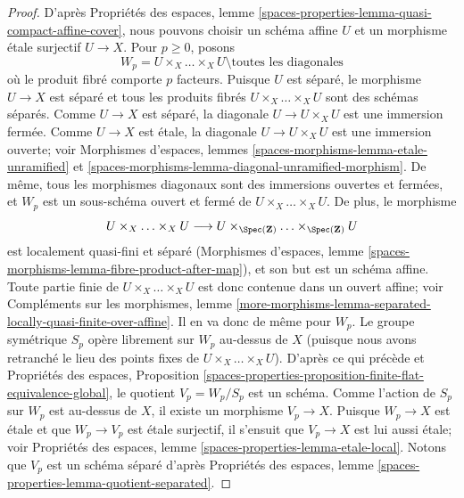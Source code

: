 \begin{proof}
D'après Propriétés des espaces, lemme
\ref{spaces-properties-lemma-quasi-compact-affine-cover},
nous pouvons choisir un schéma affine $U$ et un morphisme étale surjectif
$U \to X$. Pour $p \geq 0$, posons
$$
W_p = U \times_X \ldots \times_X U \setminus
\text{toutes les diagonales}
$$
où le produit fibré comporte $p$ facteurs. Puisque $U$ est séparé,
le morphisme $U \to X$ est séparé et tous les produits fibrés
$U \times_X \ldots \times_X U$ sont des schémas séparés. Comme $U \to X$
est séparé, la diagonale $U \to U \times_X U$ est une immersion fermée.
Comme $U \to X$ est étale, la diagonale $U \to U \times_X U$ est une
immersion ouverte; voir Morphismes d'espaces, lemmes
\ref{spaces-morphisms-lemma-etale-unramified} et
\ref{spaces-morphisms-lemma-diagonal-unramified-morphism}.
De même, tous les morphismes diagonaux sont des immersions ouvertes et
fermées, et $W_p$ est un sous-schéma ouvert et fermé de
$U \times_X \ldots \times_X U$. De plus, le morphisme
$$
U \times_X \ldots \times_X U \longrightarrow
U \times_{\Spec(\mathbf{Z})} \ldots \times_{\Spec(\mathbf{Z})} U
$$
est localement quasi-fini et séparé (Morphismes d'espaces,
lemme \ref{spaces-morphisms-lemma-fibre-product-after-map}),
et son but est un schéma affine. Toute partie finie de
$U \times_X \ldots \times_X U$ est donc contenue dans un ouvert affine;
voir Compléments sur les morphismes, lemme
\ref{more-morphisms-lemma-separated-locally-quasi-finite-over-affine}.
Il en va donc de même pour $W_p$.
Le groupe symétrique $S_p$ opère librement sur $W_p$ au-dessus de $X$
(puisque nous avons retranché le lieu des points fixes de
$U \times_X \ldots \times_X U$). D'après ce qui précède et
Propriétés des espaces, Proposition
\ref{spaces-properties-proposition-finite-flat-equivalence-global},
le quotient $V_p = W_p/S_p$ est un schéma. Comme l'action de $S_p$ sur
$W_p$ est au-dessus de $X$, il existe un morphisme $V_p \to X$.
Puisque $W_p \to X$ est étale et que $W_p \to V_p$ est étale surjectif,
il s'ensuit que $V_p \to X$ est lui aussi étale; voir
Propriétés des espaces, lemme \ref{spaces-properties-lemma-etale-local}.
Notons que $V_p$ est un schéma séparé d'après
Propriétés des espaces, lemme
\ref{spaces-properties-lemma-quotient-separated}.


\end{proof}
